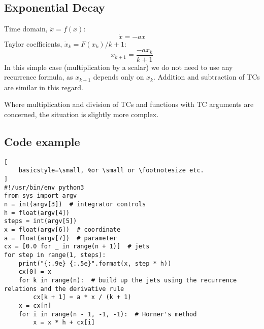 \documentclass[11pt]{article}
\begin{document}
\subsection{Exponential Decay}
Time domain, $\dot{x} = f(x)$:
\begin{equation}
\dot{x} = - a x
\end{equation}
Taylor coefficients, $\dot{x}_k = F(x_k) / k + 1$:
\begin{equation}
x_{k+1} = \frac{- a x_k} {k + 1}
\end{equation}
In this simple case (multiplication by a scalar) we do not need to use any recurrence formula, as $x_{k+1}$ depends only on $x_k$.
Addition and subtraction of TCs are similar in this regard.

Where multiplication and division of TCs and functions with TC arguments are concerned, the situation is slightly more complex.
\subsection{Code example}
\begin{lstlisting}[
    basicstyle=\small, %or \small or \footnotesize etc.
]
#!/usr/bin/env python3
from sys import argv
n = int(argv[3])  # integrator controls
h = float(argv[4])
steps = int(argv[5])
x = float(argv[6])  # coordinate
a = float(argv[7])  # parameter
cx = [0.0 for _ in range(n + 1)]  # jets
for step in range(1, steps):
    print("{:.9e} {:.5e}".format(x, step * h))
    cx[0] = x
    for k in range(n):  # build up the jets using the recurrence relations and the derivative rule
        cx[k + 1] = a * x / (k + 1)
    x = cx[n]
    for i in range(n - 1, -1, -1):  # Horner's method
        x = x * h + cx[i]
\end{lstlisting}
\end{document}
